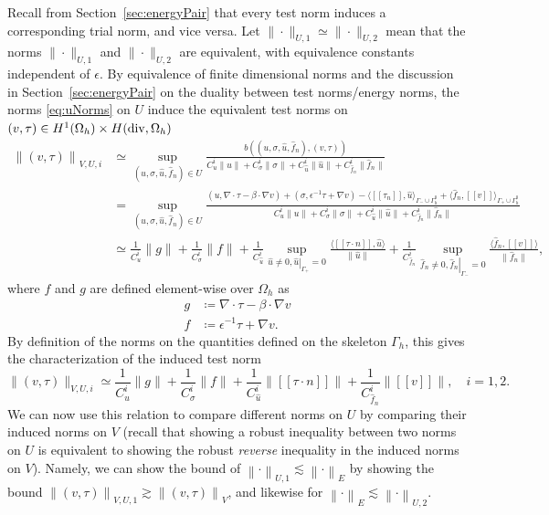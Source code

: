 \documentclass[11pt,onecolumn]{scrartcl}
\newcommand{\eqnref}[1]{\eqref{eq:#1}}
\newcommand{\secref}[1]{\ref{sec:#1}}
\newcommand{\nor}[1]{\left\| #1 \right\|}
\newcommand{\LRs}[1]{\left[ #1 \right]}
\newcommand{\jump}[1] {\ensuremath{\LRs{\![#1]\!}}}
\newcommand{\Gh}{\Gamma_h}
\newcommand{\Oh}{\Omega_h}
\newcommand{\grad}{\nabla}
\renewcommand{\div}{\grad \cdot}
\begin{document}
Recall from Section~\secref{energyPair} that every test norm induces a corresponding trial norm, and vice versa. Let $\|\cdot\|_{U,1} \simeq \|\cdot\|_{U,2}$ mean that the norms $\|\cdot\|_{U,1}$ and $\|\cdot\|_{U,2}$ are equivalent, with equivalence constants independent of $\epsilon$. By equivalence of finite dimensional norms and the discussion in Section~\secref{energyPair} on the duality between test norms/energy norms, the norms \eqnref{uNorms} on $U$ induce the equivalent test norms on $\left(v,\tau\right) \in H^1(\Oh)\times H({\rm div},\Oh)$
\begin{align*}
\left\|\left(v,\tau\right)\right\|_{V,{U,i}} &\simeq \sup_{\left(u,\sigma,\widehat{u},\widehat{f}_n\right)\in U}\frac{b\left(\left(u,\sigma,\widehat{u},\widehat{f}_n\right),\left(v,\tau\right)\right)}{C_u^i\|u\| + C_\sigma^i\|\sigma\| + C_{\widehat{u}}^i\|\widehat{u}\|+ C_{\widehat{f}_n}^i\|\widehat{f}_n\|}\\
&= \sup_{\left(u,\sigma,\widehat{u},\widehat{f}_n\right)\in U}\frac{\left(u,\div \tau - \beta \cdot \grad v\right) + \left(\sigma, \epsilon^{-1} \tau + \grad v\right) - \langle \jump{\tau_n}, \widehat{u} \rangle_{\Gamma_-\cup \Gh^0} + \langle \widehat{f}_n, \jump{v} \rangle_{\Gamma_+ \cup \Gh^0}}{C_u^i\|u\| + C_\sigma^i\|\sigma\| + C_{\widehat{u}}^i\|\widehat{u}\|+ C_{\widehat{f}_n}^i\|\widehat{f}_n\|}\\
& \simeq \frac{1}{C_u^i}\|g\| + \frac{1}{C_\sigma^i}\|f\| + \frac{1}{C_{\widehat{u}}^i}\sup_{\widehat{u}\neq 0, \left.\widehat{u}\right|_{\Gamma_+} = 0} \frac{\langle \jump{\tau\cdot n}, \widehat{u}\rangle}{\|\widehat{u}\|} +\frac{1}{C_{\widehat{f}_n}^i}\sup_{\widehat{f}_n\neq 0, \left.\widehat{f}_n\right|_{\Gamma_-}=0}\frac{\langle \widehat{f}_n, \jump{v}\rangle}{\|\widehat{f}_n\|},
\end{align*}
where $f$ and $g$ are defined element-wise over $\Oh$ as 
\begin{align*}
g &\coloneqq \div \tau - \beta \cdot \grad v\\
f &\coloneqq \epsilon^{-1}\tau + \grad v.
\end{align*}
By definition of the norms on the quantities defined on the skeleton $\Gh$, this gives the characterization of the induced test norm 
\[
\|\left(v,\tau\right)\|_{V,{U,i}} \simeq \frac{1}{C_u^i}\|g\| + \frac{1}{C_\sigma^i}\|f\| + \frac{1}{C_{\widehat{u}}^i}\|\jump{\tau\cdot n}\| + \frac{1}{C_{\widehat{f}_n}^i}\|\jump{v}\|, \quad i = 1,2.
\]
We can now use this relation to compare different norms on $U$ by comparing their induced norms on $V$ (recall that showing a robust inequality between two norms on $U$ is equivalent to showing the robust \textit{reverse} inequality in the induced norms on $V$). Namely, we can show the bound of $\nor{\cdot}_{U,1} \lesssim \nor{\cdot}_E$ by showing the bound $\nor{\left(v,\tau\right)}_{V,U,1} \gtrsim \nor{\left(v,\tau\right)}_{V}$, and likewise for $\nor{\cdot}_E \lesssim \nor{\cdot}_{U,2}$. 
\end{document}
